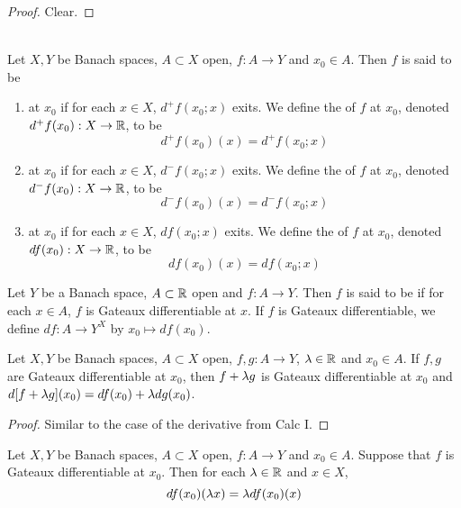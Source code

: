 \documentclass{book}
\begin{document}
	\begin{proof}
	Clear.
	\end{proof}
	
	\begin{defn} \ld{}\\
	Let $X,Y$ be Banach spaces, $A \subset X$ open, $f:A \rightarrow Y$ and $x_0 \in A$. Then $f$ is said to be 
	\begin{enumerate}
	\item {} at $x_0$ if for each $x \in X$, $d^+ f(x_0; x)$ exits. We define the  of $f$ at $x_0$, denoted $d^+ f(x_0) : X \rightarrow \mathbb{R}$, to be $$d^+ f(x_0)(x) = d^+ f(x_0;x)$$ 
	
	\item {} at $x_0$ if for each $x \in X$, $d^- f(x_0; x)$ exits. We define the  of $f$ at $x_0$, denoted $d^- f(x_0) : X \rightarrow \mathbb{R}$, to be $$d^- f(x_0)(x) = d^- f(x_0;x)$$
	
	\item {} at $x_0$ if for each $x \in X$, $d f(x_0; x)$ exits. We define the  of $f$ at $x_0$, denoted $d f(x_0) : X \rightarrow \mathbb{R}$, to be $$d f(x_0)(x) = d f(x_0;x)$$
	\end{enumerate}
	\end{defn}
	
	\begin{defn} 
Let $Y$ be a Banach space, $A \subset \mathbb{R}$ open and $f:A \rightarrow Y$. Then $f$ is said to be  if for each $x \in A$, $f$ is Gateaux differentiable at $x$. If $f$ is Gateaux differentiable, we define $df:A \rightarrow Y^X$ by $x_0 \mapsto df(x_0)$.
\end{defn}	
	
	\begin{ex} 
	Let $X, Y$ be Banach spaces, $A \subset X$ open, $f,g :A \rightarrow Y$, $\lambda \in \mathbb{R}$ and $x_0 \in A$. If $f, g$ are Gateaux differentiable at $x_0$, then $f + \lambda g$ is Gateaux differentiable at $x_0$ and $d[f+\lambda g](x_0) = df(x_0) + \lambda dg(x_0)$.
	\end{ex}
	
	\begin{proof}
	Similar to the case of the derivative from Calc I. 
	\end{proof}		
	
	\begin{ex} 
	Let $X, Y$ be Banach spaces, $A \subset X$ open, $f:A \rightarrow Y$ and $x_0 \in A$. Suppose that $f$ is Gateaux differentiable at $x_0$. Then for each $\lambda \in \mathbb{R}$ and $x \in X$, $$df(x_0)(\lambda x) = \lambda df(x_0)(x)$$
	\end{ex}
	
\end{document}
